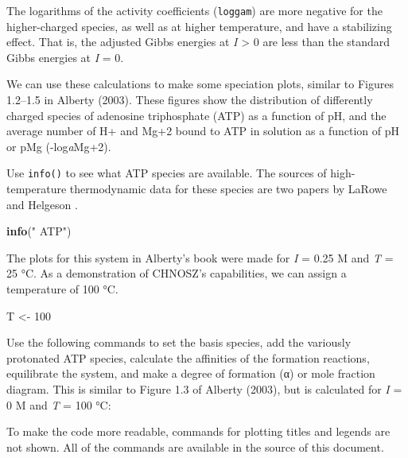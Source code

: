 \documentclass[]{tufte-book}
\newenvironment{Shaded}{}{}
\newcommand{\KeywordTok}[1]{\textcolor[rgb]{0.00,0.44,0.13}{\textbf{#1}}}
\newcommand{\DecValTok}[1]{\textcolor[rgb]{0.25,0.63,0.44}{#1}}
\newcommand{\StringTok}[1]{\textcolor[rgb]{0.25,0.44,0.63}{#1}}
\newcommand{\NormalTok}[1]{#1}
\begin{document}
The logarithms of the activity coefficients (\texttt{loggam}) are more
negative for the higher-charged species, as well as at higher
temperature, and have a stabilizing effect. That is, the adjusted Gibbs
energies at \emph{I} \textgreater{} 0 are less than the standard Gibbs
energies at \emph{I} = 0.

We can use these calculations to make some speciation plots, similar to
Figures 1.2--1.5 in Alberty (2003). These figures show the distribution
of differently charged species of adenosine triphosphate (ATP) as a
function of pH, and the average number of H+ and Mg+2 bound to ATP in
solution as a function of pH or pMg (-log\emph{a}Mg+2).

Use {\texttt{info()}} to see what ATP species are available. The sources
of high-temperature thermodynamic data for these species are two papers
by LaRowe and Helgeson \citetext{\citeyear{LH06a}; \citeyear{LH06b}}.

\begin{Shaded}
\begin{Highlighting}[]
\KeywordTok{info}\NormalTok{(}\StringTok{" ATP"}\NormalTok{)}
\end{Highlighting}
\end{Shaded}

The plots for this system in Alberty's book were made for \emph{I} =
0.25 M and \emph{T} = 25 °C. As a demonstration of CHNOSZ's
capabilities, we can assign a temperature of 100 °C.

\begin{Shaded}
\begin{Highlighting}[]
\NormalTok{T <-}\StringTok{ }\DecValTok{100}
\end{Highlighting}
\end{Shaded}

Use the following commands to set the basis species, add the variously
protonated ATP species, calculate the affinities of the formation
reactions, equilibrate the system, and make a degree of formation (α) or
mole fraction diagram. This is similar to Figure 1.3 of Alberty (2003),
but is calculated for \emph{I} = 0 M and \emph{T} = 100 °C:

\begin{marginfigure}
To make the code more readable, commands for plotting titles and legends
are not shown. All of the commands are available in the source of this
document.
\end{marginfigure}
\end{document}
